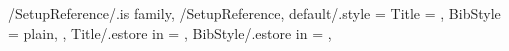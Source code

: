 {%
  \singlespacing%
  \StartNewPage%
  \renewcommand\bibname{\GetReferenceTitle}
  
  {%
    {%
      {%
        {%
          {%
            {%
              {%
                {%
                  {} %
                  {} %
                } %
                {%
                } %
              } %
              {%
              } %
            } %
            {%
            } %
          } %
          {%
          } %
        } %
        {%
        } %
      } %
      {%
      } %
    } %
    {%
    } %
  } %
  {%
  } %
  \EndChapter%
} %


\pgfkeys
{
  /SetupReference/.is family, /SetupReference,
  default/.style =
  {
    Title = {\TextDefaultTitleReferenceEng},
    BibStyle = {plain},
  },
  Title/.estore in = \GetReferenceTitle,
  BibStyle/.estore in = \GetReferenceBibStyle,
} %

\newcommand\SetupReference[1]
{%
  \pgfkeys{/SetupReference, default, #1}%
  \ifthenelse{\equal{\GetReferenceBibStyle}{apacite}}%
  {\usepackage[notocbib]{apacite}}{}
} %

